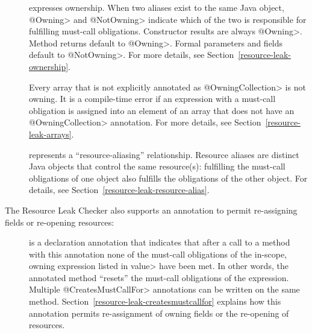 \begin{description}

\item[]
\item[]
  expresses ownership.  When two aliases exist to the same Java object,
  \<@Owning> and \<@NotOwning> indicate which of the two is responsible for
  fulfilling must-call obligations.
  Constructor results are always \<@Owning>. Method returns default to
  \<@Owning>.  Formal parameters and fields default to \<@NotOwning>.
  For more details, see Section~\ref{resource-leak-ownership}.
\item[]
  Every array that is not explicitly annotated as \<@OwningCollection> is not owning. It is a compile-time error if an expression with a must-call obligation is assigned into an element of an array that does not have an \<@OwningCollection> annotation. For more details, see Section~\ref{resource-leak-arrays}.

\item[]
  represents a ``resource-aliasing'' relationship.  Resource aliases are
  distinct Java objects that control the same resource(s):
  fulfilling the must-call obligations of one object also
  fulfills the obligations of the other object.  For details,
  see Section~\ref{resource-leak-resource-alias}.

\end{description}

The Resource Leak Checker also supports an annotation to permit re-assigning
fields or re-opening resources:

\begin{description}

\item[]
  is a declaration annotation that indicates that after a call to a method
  with this annotation none of the must-call obligations of the in-scope, owning expression
  listed in \<value> have been met.
  In other words, the annotated method ``resets'' the must-call obligations of the expression.
  Multiple \<@CreatesMustCallFor>
  annotations can be written on the same method.  Section~\ref{resource-leak-createsmustcallfor}
  explains how this annotation permits re-assignment of owning
  fields or the re-opening of resources.

\end{description}


